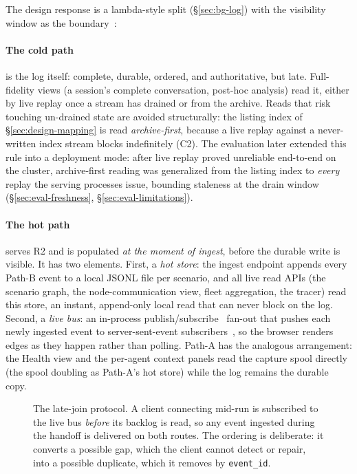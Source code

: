 The design response is a lambda-style split (\S\ref{sec:bg-log})
with the visibility window as the boundary~\cite{marz2015big}:

\paragraph{The cold path} is the log itself: complete, durable, ordered,
and authoritative, but late. Full-fidelity views (a session's complete
conversation, post-hoc analysis) read it, either by live replay once a stream
has drained or from the archive. Reads that risk touching
un-drained state are avoided structurally: the listing index of
\S\ref{sec:design-mapping} is read \emph{archive-first}, because a live
replay against a never-written index stream blocks indefinitely (C2).
The evaluation later extended this rule
into a deployment mode: after live replay proved unreliable end-to-end
on the cluster, archive-first reading was generalized from
the listing index to \emph{every} replay the serving processes issue,
bounding staleness at the drain window
(\S\ref{sec:eval-freshness}, \S\ref{sec:eval-limitations}).

\paragraph{The hot path} serves R2 and is populated \emph{at the moment of
ingest}, before the durable write is visible. It has two elements. First, a
\emph{hot store}: the ingest endpoint appends every Path-B event to a local
JSONL file per scenario, and all live read APIs (the scenario graph, the
node-communication view, fleet aggregation, the tracer) read this store,
an instant, append-only local read that can never block on the log. Second,
a \emph{live bus}: an in-process publish/subscribe~\cite{eugster2003pubsub}
fan-out that pushes each newly ingested event to server-sent-event
subscribers~\cite{whatwg2026sse}, so the browser
renders edges as they happen rather than polling. Path-A has the analogous
arrangement: the Health view and the per-agent context panels read the
capture spool directly (the spool doubling as Path-A's hot store)
while the log remains the durable copy.

\begin{figure}[t]
  \centering
  \resizebox{0.88\linewidth}{!}{}
  \caption[The late-join protocol]{The late-join protocol. A client
  connecting mid-run is subscribed to the live bus \emph{before} its backlog
  is read, so any event ingested during the handoff is delivered on both
  routes. The ordering is deliberate: it converts a possible gap, which the
  client cannot detect or repair, into a possible duplicate, which it removes
  by \texttt{event\_id}.}
  \label{fig:latejoin}
\end{figure}

